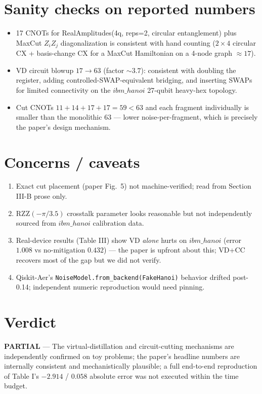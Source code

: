 \documentclass[11pt]{article}
\begin{document}
\section{Sanity checks on reported numbers}
\begin{itemize}
  \item 17 CNOTs for RealAmplitudes(4q, reps=2, circular entanglement) plus MaxCut $Z_iZ_j$ diagonalization is consistent with hand counting ($2\times 4$ circular CX + basis-change CX for a MaxCut Hamiltonian on a 4-node graph $\approx 17$).
  \item VD circuit blowup $17 \to 63$ (factor $\sim 3.7$): consistent with doubling the register, adding controlled-SWAP-equivalent bridging, and inserting SWAPs for limited connectivity on the $ibm\_hanoi$ 27-qubit heavy-hex topology.
  \item Cut CNOTs $11+14+17+17 = 59 < 63$ and each fragment individually is smaller than the monolithic 63 --- lower noise-per-fragment, which is precisely the paper's design mechanism.
\end{itemize}

\section{Concerns / caveats}
\begin{enumerate}
  \item Exact cut placement (paper Fig.\ 5) not machine-verified; read from Section III-B prose only.
  \item $\mathrm{RZZ}(-\pi/3.5)$ crosstalk parameter looks reasonable but not independently sourced from $ibm\_hanoi$ calibration data.
  \item Real-device results (Table III) show VD \emph{alone} hurts on $ibm\_hanoi$ (error $1.008$ vs no-mitigation $0.432$) --- the paper is upfront about this; VD+CC recovers most of the gap but we did not verify.
  \item Qiskit-Aer's \texttt{NoiseModel.from\_backend(FakeHanoi)} behavior drifted post-0.14; independent numeric reproduction would need pinning.
\end{enumerate}

\section*{Verdict}
\textbf{PARTIAL} --- The virtual-distillation and circuit-cutting mechanisms are independently confirmed on toy problems; the paper's headline numbers are internally consistent and mechanistically plausible; a full end-to-end reproduction of Table I's $-2.914$ / $0.058$ absolute error was not executed within the time budget.
\end{document}
